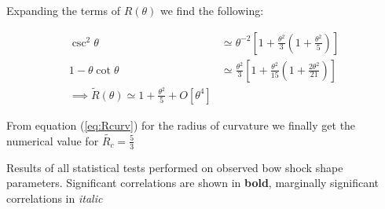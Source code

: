 Expanding the terms of $R(\theta)$ we find the following:

\begin{align}
  \csc^2\theta &\simeq \theta^{-2}\left[1+\frac{\theta^2}{3}\left(1+\frac{\theta^2}{5}\right)\right] \\
  1-\theta\cot\theta &\simeq \frac{\theta^2}{3}\left[1 + \frac{\theta^2}{15}\left(1+\frac{2\theta^2}{21}\right)\right] \\
  \implies \tilde{R}(\theta) \simeq 1 + \frac{\theta^2}{5} + O\left[\theta^4\right]
\end{align}

From equation (\ref{eq:Rcurv}) for the radius of curvature we finally get the numerical value for $\tilde{R_c} = \frac{5}{3}$
\clearpage

\addtocounter{section}{1}
\begin{landscape}
\begin{table}
  \setlength\tabcolsep{3pt}
  \caption{Results of all statistical tests performed on observed bow shock shape parameters. Significant correlations are shown in \textbf{bold}, marginally significant correlations in \textit{italic}}
  \label{tab:big-p}
  
\end{table}
\end{landscape}
